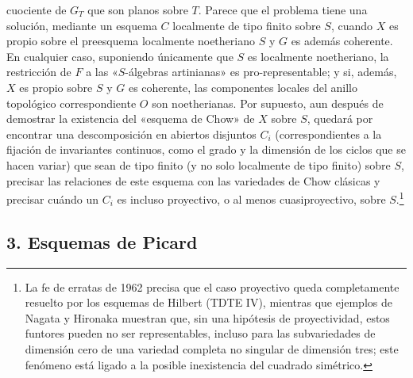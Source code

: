 \documentclass[11pt,twoside,openany]{book}
\numberwithin{equation}{section}
\newcommand{\src}[1]{%
  \phantomsection\hypertarget{src:#1}{}%
  \marginpar{\raggedleft\footnotesize\sffamily #1}%
}
\theoremstyle{plain}
\theoremstyle{definition}
\theoremstyle{remark}
\newcommand{\FgaUnitKey}{frontmatter}
\renewcommand{\src}[1]{%
  \phantomsection\hypertarget{src:\FgaUnitKey:#1}{}%
  \marginpar{\raggedleft\footnotesize\sffamily #1}%
}
\theoremstyle{plain}
\theoremstyle{definition}
\theoremstyle{remark}
\begin{document}
\src{383}
cuociente de $G_T$ que son planos sobre $T$. Parece que el problema tiene una
solución, mediante un esquema $C$ localmente de tipo finito sobre $S$, cuando
$X$ es propio sobre el preesquema localmente noetheriano $S$ y $G$ es además
coherente. En cualquier caso, suponiendo únicamente que $S$ es localmente
noetheriano, la restricción de $F$ a las «$S$-álgebras artinianas» es
pro-representable; y si, además, $X$ es propio sobre $S$ y $G$ es coherente, las
componentes locales del anillo topológico correspondiente $O$ son
noetherianas. Por supuesto, aun después de demostrar la existencia del
«esquema de Chow» de $X$ sobre $S$, quedará por
encontrar una descomposición en abiertos disjuntos $C_i$ (correspondientes a
la fijación de invariantes continuos, como el grado y la dimensión de los
ciclos que se hacen variar) que sean de tipo finito (y no solo localmente de
tipo finito) sobre $S$, precisar las relaciones de este esquema con las
variedades de Chow clásicas y precisar cuándo un $C_i$ es incluso proyectivo,
o al menos cuasiproyectivo, sobre $S$.\footnote{La fe de erratas de 1962
precisa que el caso proyectivo queda completamente resuelto por los esquemas de
Hilbert (TDTE IV), mientras que ejemplos de Nagata y Hironaka muestran que, sin
una hipótesis de proyectividad, estos funtores pueden no ser representables,
incluso para las subvariedades de dimensión cero de una variedad completa no
singular de dimensión tres; este fenómeno está ligado a la posible
inexistencia del cuadrado simétrico.}

\subsection*{3. Esquemas de Picard}
\end{document}
